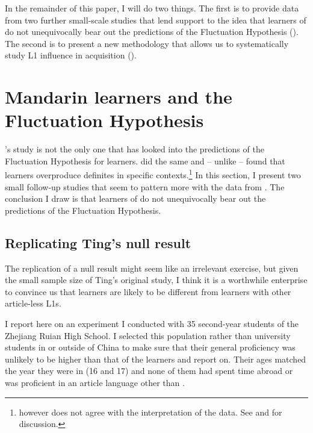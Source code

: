 \documentclass[output=paper,
modfonts
]{langscibook}
\begin{document}
In the remainder of this paper, I will do two things. The first is to provide data from two further small-scale studies that lend support to the idea that  learners of  do not unequivocally bear out the predictions of the Fluctuation Hypothesis (). The second is to present a new methodology that allows us to systematically study L1 influence in acquisition ().

\section{Mandarin learners and the Fluctuation Hypothesis}
\label{sec:lebruyn:4}

\citeauthor{SnapeLeungTing2006}’s study is not the only one that has looked into the predictions of the Fluctuation Hypothesis for  learners. \citet{Trenkic2008} did the same and – unlike \citeauthor{SnapeLeungTing2006} – found that  learners overproduce definites in  specific contexts.\footnote{\citet{Trenkic2008} however does not agree with the interpretation of the data. See \citet{Trenkic2008} and \citet{IoninZubizarretaPhilippov2009} for discussion.}  In this section, I present two small follow-up studies that seem to pattern more with the data from \citet{SnapeLeungTing2006}. The conclusion I draw is that  learners of  do not unequivocally bear out the predictions of the Fluctuation Hypothesis.

\subsection{Replicating Ting's null result}\label{sec:lebruyn:4-1}

The replication of a null result might seem like an irrelevant exercise, but given the small sample size of Ting’s original study, I think it is a worthwhile enterprise to convince us that  learners are likely to be different from learners with other article-less L1s.

I report here on an experiment I conducted with 35 second-year students of the Zhejiang Ruian High School. I selected this population rather than university students in or outside of China to make sure that their general proficiency was unlikely to be higher than that of the  learners \citet{Hawkinsetal2006} and \citet{Reidetal2006} report on. Their ages matched the year they were in (16 and 17) and none of them had spent time abroad or was proficient in an article language other than .
\end{document}
